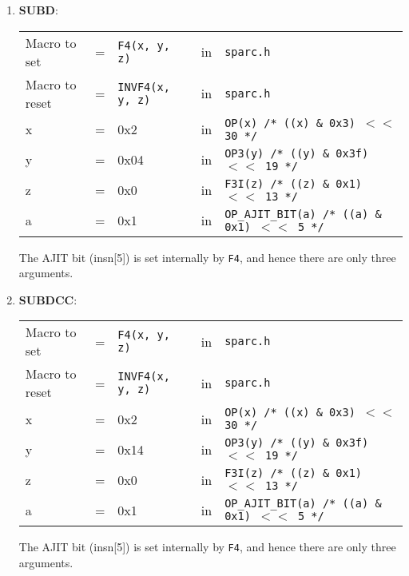 \begin{itemize}
\begin{enumerate}
  \item \textbf{SUBD}:\\
    \begin{tabular}[h]{lclcl}
      Macro to set  &=& \texttt{F4(x, y, z)} &in& \texttt{sparc.h}     \\
      Macro to reset  &=& \texttt{INVF4(x, y, z)} &in& \texttt{sparc.h}     \\
      x &=& 0x2      &in& \texttt{OP(x)  /* ((x) \& 0x3)  $<<$ 30 */} \\
      y &=& 0x04     &in& \texttt{OP3(y) /* ((y) \& 0x3f) $<<$ 19 */} \\
      z &=& 0x0      &in& \texttt{F3I(z) /* ((z) \& 0x1)  $<<$ 13 */} \\
      a &=& 0x1      &in& \texttt{OP\_AJIT\_BIT(a) /* ((a) \& 0x1)  $<<$ 5 */}
    \end{tabular}

    The AJIT bit  (insn[5]) is set internally by  \texttt{F4}, and hence
    there are only three arguments.

  \item \textbf{SUBDCC}:\\
    \begin{tabular}[h]{lclcl}
      Macro to set  &=& \texttt{F4(x, y, z)} &in& \texttt{sparc.h}     \\
      Macro to reset  &=& \texttt{INVF4(x, y, z)} &in& \texttt{sparc.h}     \\
      x &=& 0x2      &in& \texttt{OP(x)  /* ((x) \& 0x3)  $<<$ 30 */} \\
      y &=& 0x14     &in& \texttt{OP3(y) /* ((y) \& 0x3f) $<<$ 19 */} \\
      z &=& 0x0      &in& \texttt{F3I(z) /* ((z) \& 0x1)  $<<$ 13 */} \\
      a &=& 0x1      &in& \texttt{OP\_AJIT\_BIT(a) /* ((a) \& 0x1)  $<<$ 5 */}
    \end{tabular}

    The AJIT bit  (insn[5]) is set internally by  \texttt{F4}, and hence
    there are only three arguments.
  \end{enumerate}


\end{itemize}
